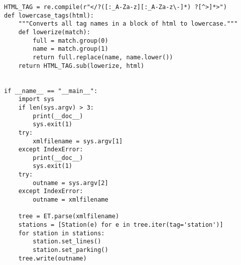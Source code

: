 \documentclass[12pt]{article}
\begin{document}
\begin{verbatim}
HTML_TAG = re.compile(r"</?([:_A-Za-z][:_A-Za-z\-]*) ?[^>]*>")
def lowercase_tags(html):
    """Converts all tag names in a block of html to lowercase."""
    def lowerize(match):
        full = match.group(0)
        name = match.group(1)
        return full.replace(name, name.lower())
    return HTML_TAG.sub(lowerize, html)


if __name__ == "__main__":
    import sys
    if len(sys.argv) > 3:
        print(__doc__)
        sys.exit(1)
    try:
        xmlfilename = sys.argv[1]
    except IndexError:
        print(__doc__)
        sys.exit(1)
    try:
        outname = sys.argv[2]
    except IndexError:
        outname = xmlfilename

    tree = ET.parse(xmlfilename)
    stations = [Station(e) for e in tree.iter(tag='station')]
    for station in stations:
        station.set_lines()
        station.set_parking()
    tree.write(outname)

\end{verbatim}
\end{document}
